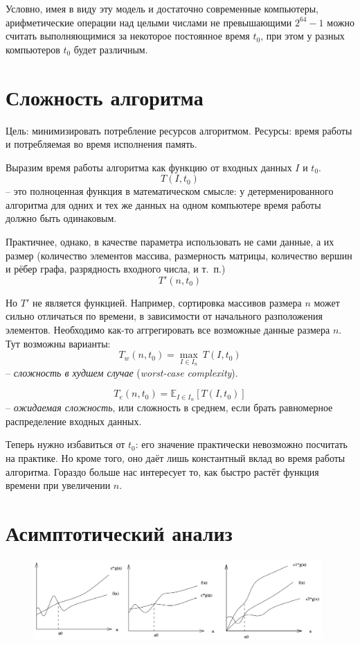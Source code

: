 \documentclass[12pt,a4paper]{report}
\begin{document}
Условно, имея в виду эту модель и достаточно современные компьютеры, арифметические операции над целыми числами не превышающими $2^{64}-1$ можно считать выполняющимися за некоторое постоянное время $t_0$, при этом у разных компьютеров $t_0$ будет различным.


\section{Сложность алгоритма}

Цель: минимизировать потребление ресурсов алгоритмом. Ресурсы: время работы и потребляемая во время исполнения память.

Выразим время работы алгоритма как функцию от входных данных $I$ и $t_0$.
$$
T(I, t_0)
$$
-- это полноценная функция в математическом смысле: у детерменированного алгоритма для одних и тех же данных на одном компьютере время работы должно быть одинаковым.

Практичнее, однако, в качестве параметра использовать не сами данные, а их размер (количество элементов массива, размерность матрицы, количество вершин и рёбер графа, разрядность входного числа, и т.~п.)
$$
T'(n, t_0)
$$

Но $T'$ не является функцией. Например, сортировка массивов размера $n$ может сильно отличаться по времени, в зависимости от начального разположения элементов. Необходимо как-то аггрегировать все возможные данные размера $n$. Тут возможны варианты:
$$
T_w(n, t_0) = \max_{I \in I_n}~{T(I, t_0)}
$$
-- {\em сложность в худшем случае} ({\em worst-case complexity}).

$$
T_e(n, t_0) = \mathbb{E}_{I \in I_n} \left[ {T(I, t_0)} \right]
$$
-- {\em ожидаемая сложность}, или сложность в среднем, если брать равномерное распределение входных данных.

Теперь нужно избавиться от $t_0$: его значение практически невозможно посчитать на практике. Но кроме того, оно даёт лишь константный вклад во время работы алгоритма. Гораздо больше нас интересует то, как быстро растёт функция времени при увеличении $n$.


\section{Асимптотический анализ}

\begin{figure}
\centering
\includegraphics[width=11cm]{classes.png}
\end{figure}
\end{document}
